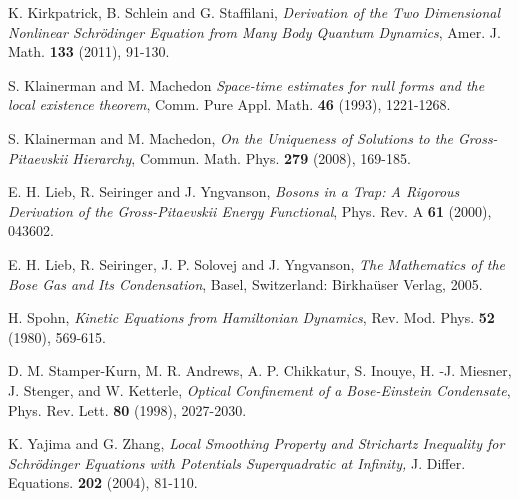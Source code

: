 \documentclass[reqno]{amsart}
\theoremstyle{plain}
\numberwithin{equation}{section}
\begin{document}
\begin{thebibliography}{99}
 K. Kirkpatrick, B. Schlein and G. Staffilani, \emph{Derivation of the Two Dimensional Nonlinear Schr\"{o}dinger Equation from
Many Body Quantum Dynamics}, Amer. J. Math. \textbf{133} (2011), 91-130.

 S. Klainerman and M. Machedon \emph{Space-time estimates for null forms and the local existence theorem}, Comm.
Pure Appl. Math. \textbf{46} (1993), 1221-1268.

 S. Klainerman and M. Machedon, \emph{On the
Uniqueness of Solutions to the Gross-Pitaevskii Hierarchy}, Commun. Math.
Phys. \textbf{279} (2008), 169-185.

 E. H. Lieb, R. Seiringer and J. Yngvanson, \emph{Bosons in a
Trap: A Rigorous Derivation of the Gross-Pitaevskii Energy Functional},
Phys. Rev. A \textbf{61} (2000), 043602.

 E. H. Lieb, R. Seiringer, J. P. Solovej and J. Yngvanson, 
\emph{The Mathematics of the Bose Gas and Its Condensation}, Basel,
Switzerland: Birkha\"{u}ser Verlag, 2005.

 H. Spohn, \emph{Kinetic Equations from Hamiltonian Dynamics}, Rev. Mod. Phys. \textbf{52} (1980), 569-615.

 D. M. Stamper-Kurn, M. R. Andrews, A. P. Chikkatur, S.
Inouye, H. -J. Miesner, J. Stenger, and W. Ketterle, \emph{Optical
Confinement of a Bose-Einstein Condensate}, Phys. Rev. Lett. \textbf{80 }(1998), 2027-2030.

 K. Yajima and G. Zhang, \emph{Local Smoothing Property and
Strichartz Inequality for Schr\"{o}dinger Equations with Potentials
Superquadratic at Infinity, }J. Differ. Equations. \textbf{202 }(2004),
81-110.
\end{thebibliography}
\end{document}
